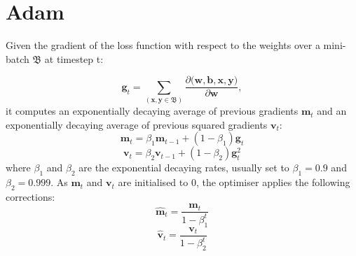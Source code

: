 \chapter{Adam} \label{Appendix: Adam}

Given the gradient of the loss function with respect to the weights over a mini-batch $\mathfrak{B}$ at timestep t: 

\begin{equation}
\mathbf{g}_t = 
\sum_{(\mathbf{x}, \mathbf{y} \in \mathfrak{B})}
\frac{
	\partial \mathfrak(\mathbf{w}, \mathbf{b}, \mathbf{x}, \mathbf{y})
}{
	\partial \mathbf{w}
},
\end{equation}
it computes an exponentially decaying average of previous gradients $\mathbf{m}_t$ and an exponentially decaying average of previous squared gradients $\mathbf{v}_t$:
\begin{equation}
\mathbf{m}_t = \beta_1 \mathbf{m}_{t-1} + (1-\beta_1)\mathbf{g}_t 
\end{equation}
\begin{equation}
\mathbf{v}_t = \beta_2 \mathbf{v}_{t-1} + (1-\beta_2)\mathbf{g}_t^2 
\end{equation}
where $\beta_1$ and $\beta_2$ are the exponential decaying rates, usually set to $\beta_1 = 0.9$ and $\beta_2 = 0.999$. As $\mathbf{m}_t$ and $\mathbf{v}_t$ are initialised to $0$, the optimiser applies the following corrections: 
\begin{equation}
\mathbf{\hat{m}}_t = \frac{\mathbf{m}_t}{1-\beta_1^t}
\end{equation}
\begin{equation}
\mathbf{\hat{v}}_t = \frac{\mathbf{v}_t}{1-\beta_2^t}
\end{equation}